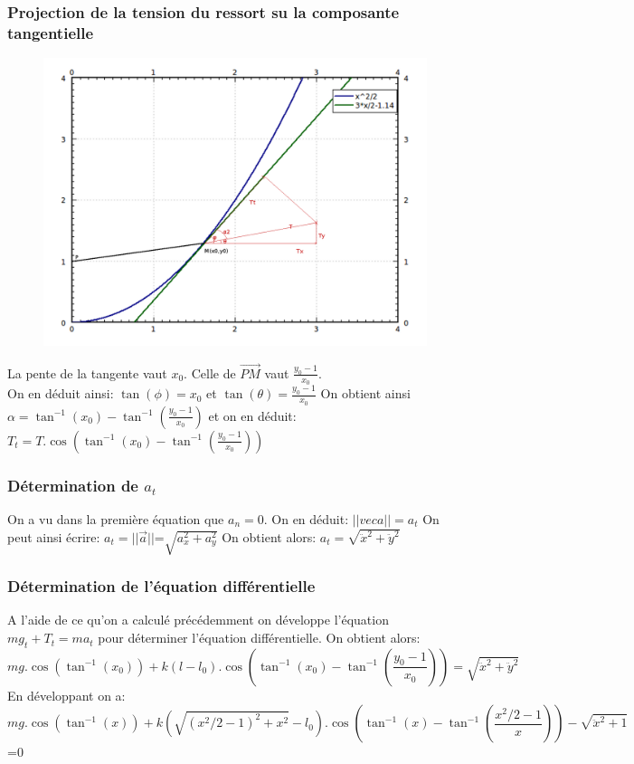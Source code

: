 \documentclass[10pt,a4paper]{article}
\begin{document}
\subsubsection{Projection de la tension du ressort su la composante tangentielle}
\begin{figure}[H]
	\includegraphics[scale=0.35]{GraphMathZoomProjectionT.png}
\end{figure} 

La pente de la tangente vaut $x_0$. Celle de $\vec{PM}$ vaut $\frac{y_0-1}{x_0}$.\\
On en déduit ainsi: $\tan(\phi)=x_0$ et $\tan(\theta)=\frac{y_0-1}{x_0}$
On obtient ainsi $\alpha=\tan^{-1}(x_0) - \tan^{-1}(\frac{y_0-1}{x_0})$ et on en déduit: $T_t=T.\cos(\tan^{-1}(x_0) - \tan^{-1}(\frac{y_0-1}{x_0}))$ \\

\subsubsection{Détermination de $a_t$}
On a vu dans la première équation que $a_n=0$. On en déduit: $||vec{a}||=a_t$
On peut ainsi écrire: $a_t=||\vec{a}||$=$\sqrt{a_x^2+a_y^2}$
On obtient alors: $a_t=\sqrt{\ddot{x}^2+\ddot{y}^2}$

\subsubsection{Détermination de l'équation différentielle}
A l'aide de ce qu'on a calculé précédemment on développe l'équation $mg_t+T_t=ma_t$ pour déterminer l'équation différentielle.
On obtient alors: 
 \[mg.\cos(\tan^{-1}(x_0)) + k(l-l_0).\cos(\tan^{-1}(x_0) - \tan^{-1}(\frac{y_0-1}{x_0}))=\sqrt{\ddot{x}^2+\ddot{y}^2}\]
 En développant on a:\[mg.\cos(\tan^{-1}(x)) + k(\sqrt{(x^2/2-1)^2+x^2}-l_0).\cos(\tan^{-1}(x) - \tan^{-1}(\frac{x^2/2-1}{x})) - \sqrt{\ddot{x}^2+1}\]=0
\end{document}
